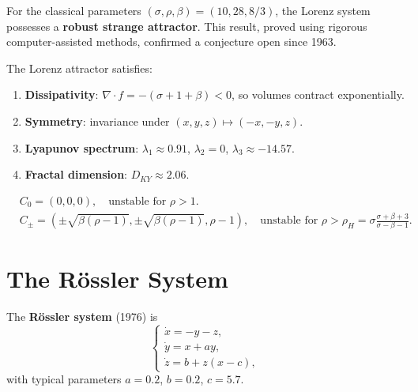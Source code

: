 \begin{theorem}[Tucker, 2002]
For the classical parameters $(\sigma, \rho, \beta) = (10, 28, 8/3)$, the
Lorenz system possesses a \textbf{robust strange attractor}. This result,
proved using rigorous computer-assisted methods, confirmed a conjecture open
since 1963.
\end{theorem}

\begin{proposition}
The Lorenz attractor satisfies:
\begin{enumerate}
    \item \textbf{Dissipativity}: $\nabla \cdot f = -(\sigma + 1 + \beta) < 0$,
    so volumes contract exponentially.
    \item \textbf{Symmetry}: invariance under $(x, y, z) \mapsto (-x, -y, z)$.
    \item \textbf{Lyapunov spectrum}: $\lambda_1 \approx 0.91$,
    $\lambda_2 = 0$, $\lambda_3 \approx -14.57$.
    \item \textbf{Fractal dimension}: $D_{KY} \approx 2.06$.
\end{enumerate}
\end{proposition}

\begin{keyformulas}[title=\textbf{Equilibria of the Lorenz System}]
\begin{align*}
    &C_0 = (0, 0, 0), \quad \text{unstable for } \rho > 1. \\
    &C_{\pm} = (\pm\sqrt{\beta(\rho-1)}, \pm\sqrt{\beta(\rho-1)}, \rho-1),
    \quad \text{unstable for }
    \rho > \rho_H = \sigma\frac{\sigma + \beta + 3}{\sigma - \beta - 1}.
\end{align*}
\end{keyformulas}

\section{The R\"ossler System}

\begin{definition}
The \textbf{R\"ossler system} (1976) is
\[
    \begin{cases}
    \dot{x} = -y - z, \\
    \dot{y} = x + ay, \\
    \dot{z} = b + z(x - c),
    \end{cases}
\]
with typical parameters $a = 0.2$, $b = 0.2$, $c = 5.7$.
\end{definition}

